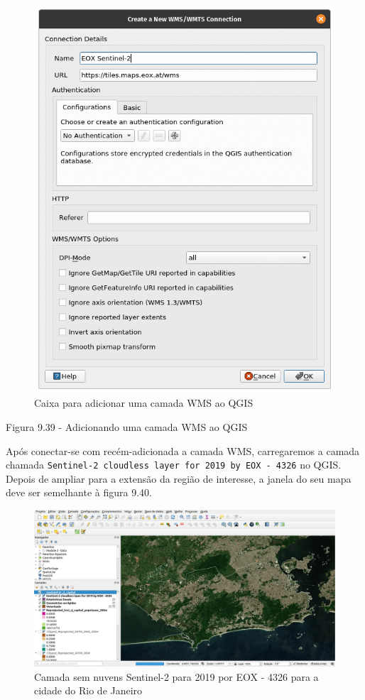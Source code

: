 \documentclass[
]{krantz}
\begin{document}
\begin{figure}
\centering
\includegraphics{media/modulo9/fig939.png}
\caption{Caixa para adicionar uma camada WMS ao QGIS}
\end{figure}

Figura 9.39 - Adicionando uma camada WMS ao QGIS

Após conectar-se com recém-adicionada a camada WMS, carregaremos a camada chamada \texttt{Sentinel-2\ cloudless\ layer\ for\ 2019\ by\ EOX\ -\ 4326} no QGIS. Depois de ampliar para a extensão da região de interesse, a janela do seu mapa deve ser semelhante à figura 9.40.

\begin{figure}
\centering
\includegraphics{media/modulo9/fig940.png}
\caption{Camada sem nuvens Sentinel-2 para 2019 por EOX - 4326 para a cidade do Rio de Janeiro}
\end{figure}
\end{document}
